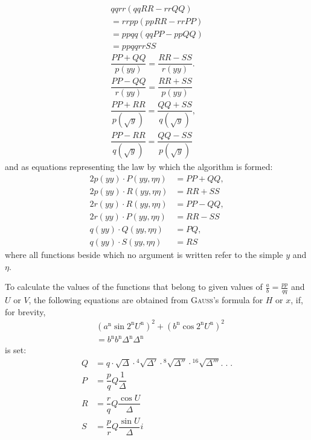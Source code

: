 \[
\begin{gathered}
qqrr(qqRR-rrQQ)\\[4pt]=rrpp(ppRR-rrPP)\\
=ppqq(qqPP-ppQQ)\\[4pt]=ppqqrrSS\\[4pt]
\dfrac{PP+QQ}{p(yy)}=\dfrac{RR-SS}{r(yy)}.\\[9pt]
\dfrac{PP-QQ}{r(yy)}=\dfrac{RR+SS}{p(yy)}\\[4pt]
\dfrac{PP+RR}{p(\surd  y)}=\dfrac{QQ+SS}{q(\surd  y)},\\[9pt]
\dfrac{PP-RR}{q(\surd  y)}=\dfrac{QQ-SS}{p(\surd  y)}
\end{gathered}
\]
and as equations representing the law by which the algorithm is formed:
\[
\begin{aligned}
2p(yy)\cdot P(yy,\eta\eta)&=PP+QQ,\\[5pt]
2p(yy)\cdot R(yy,\eta\eta)&=RR+SS\\[5pt]
2r(yy)\cdot R(yy,\eta\eta)&=PP-QQ,\\[5pt]
2r(yy)\cdot P(yy,\eta\eta)&=RR-SS\\[5pt]
q(yy)\cdot Q(yy,\eta\eta)&=PQ,\\[5pt]
q(yy)\cdot S(yy,\eta\eta)&=RS
\end{aligned}
\]
where all functions beside which no argument is written refer to the simple $y$ and $\eta$.


To calculate the values of the functions that belong to given values of $\frac ab=\frac{pp}{qq}$ and $U$ or $V$, the following equations are obtained from \textsc{Gauss}'s formula for $H$ or $x$, if, for brevity,
\[
\begin{aligned}&(a^{\mathrm n}\sin 2^{\mathrm n} U^{\mathrm n})^2+(b^{\mathrm n}\cos 2^{\mathrm n} U^{\mathrm n})^2\\[5pt]&=b^{\mathrm n} b^{\mathrm n}\Delta^{\mathrm n}\Delta^{\mathrm n}\end{aligned}
\]
is set:
\[
\begin{aligned}
Q&=q\cdot\surd \Delta\cdot{}^{4}\!\surd {\Delta'}\cdot{}^{8}\!\surd {\Delta''}\cdot{}^{16}\!\surd {\Delta'''}.\;.\;.\\[9pt]
P&=\dfrac pq Q\dfrac1\Delta\\[9pt]
R&=\dfrac rq Q\dfrac{\cos U}{\Delta}\\[9pt]
S&=\dfrac pr Q\dfrac{\sin U}{\Delta}i
\end{aligned}
\]

